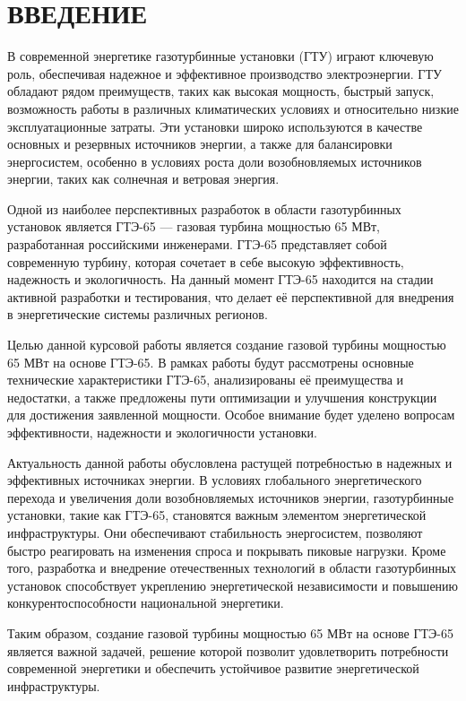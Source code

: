 \section*{ВВЕДЕНИЕ}

В современной энергетике газотурбинные установки (ГТУ) играют ключевую роль, обеспечивая надежное и эффективное производство электроэнергии. ГТУ обладают рядом преимуществ, таких как высокая мощность, быстрый запуск, возможность работы в различных климатических условиях и относительно низкие эксплуатационные затраты. Эти установки широко используются в качестве основных и резервных источников энергии, а также для балансировки энергосистем, особенно в условиях роста доли возобновляемых источников энергии, таких как солнечная и ветровая энергия.

Одной из наиболее перспективных разработок в области газотурбинных установок является ГТЭ-65 — газовая турбина мощностью 65 МВт, разработанная российскими инженерами. ГТЭ-65 представляет собой современную турбину, которая сочетает в себе высокую эффективность, надежность и экологичность. На данный момент ГТЭ-65 находится на стадии активной разработки и тестирования, что делает её перспективной для внедрения в энергетические системы различных регионов.

Целью данной курсовой работы является создание газовой турбины мощностью 65 МВт на основе ГТЭ-65. В рамках работы будут рассмотрены основные технические характеристики ГТЭ-65, анализированы её преимущества и недостатки, а также предложены пути оптимизации и улучшения конструкции для достижения заявленной мощности. Особое внимание будет уделено вопросам эффективности, надежности и экологичности установки.

Актуальность данной работы обусловлена растущей потребностью в надежных и эффективных источниках энергии. В условиях глобального энергетического перехода и увеличения доли возобновляемых источников энергии, газотурбинные установки, такие как ГТЭ-65, становятся важным элементом энергетической инфраструктуры. Они обеспечивают стабильность энергосистем, позволяют быстро реагировать на изменения спроса и покрывать пиковые нагрузки. Кроме того, разработка и внедрение отечественных технологий в области газотурбинных установок способствует укреплению энергетической независимости и повышению конкурентоспособности национальной энергетики.

Таким образом, создание газовой турбины мощностью 65 МВт на основе ГТЭ-65 является важной задачей, решение которой позволит удовлетворить потребности современной энергетики и обеспечить устойчивое развитие энергетической инфраструктуры.

